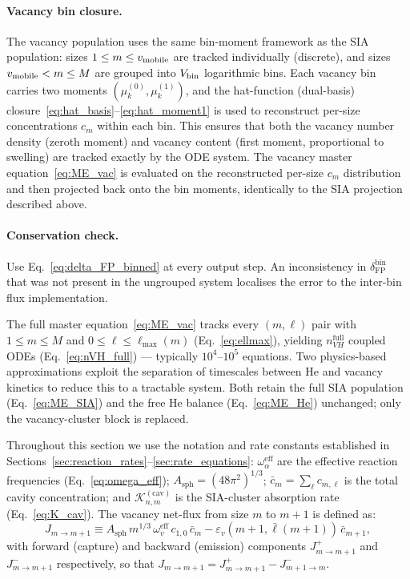 \documentclass[pdflatex,sn-basic]{sn-jnl} %
\begin{document}
\paragraph{Vacancy bin closure.}
The vacancy population uses the same bin-moment framework as the SIA
population: sizes $1 \leq m \leq v_{\rm mobile}$ are tracked individually
(discrete), and sizes $v_{\rm mobile} < m \leq M$ are grouped into
$V_{\rm bin}$ logarithmic bins. Each vacancy bin carries two moments
$(\mu_k^{(0)}, \mu_k^{(1)})$, and the hat-function (dual-basis)
closure~\eqref{eq:hat_basis}--\eqref{eq:hat_moment1} is used to
reconstruct per-size concentrations $c_m$ within each bin. This ensures
that both the vacancy number density (zeroth moment) and vacancy content
(first moment, proportional to swelling) are tracked exactly by the
ODE system. The vacancy master equation~\eqref{eq:ME_vac} is evaluated
on the reconstructed per-size $c_m$ distribution and then projected
back onto the bin moments, identically to the SIA projection described
above.

\paragraph{Conservation check.}
Use Eq.~\eqref{eq:delta_FP_binned} at every output step. An
inconsistency in $\delta_{\mathrm{FP}}^{\mathrm{bin}}$ that was not
present in the ungrouped system localises the error to the inter-bin
flux implementation.



The full master equation~\eqref{eq:ME_vac} tracks every $(m,\ell)$
pair with $1 \leq m \leq M$ and $0 \leq \ell \leq \ell_{\max}(m)$
(Eq.~\ref{eq:ellmax}), yielding $n_{VH}^{\mathrm{full}}$ coupled ODEs
(Eq.~\ref{eq:nVH_full}) --- typically $10^4$--$10^5$ equations. Two
physics-based approximations exploit the separation of timescales
between He and vacancy kinetics to reduce this to a tractable system.
Both retain the full SIA population (Eq.~\ref{eq:ME_SIA}) and the free
He balance (Eq.~\ref{eq:ME_He}) unchanged; only the vacancy-cluster
block is replaced.

Throughout this section we use the notation and rate constants
established in Sections~\ref{sec:reaction_rates}--\ref{sec:rate_equations}:
$\omega_\alpha^{\mathrm{eff}}$ are the effective reaction frequencies
(Eq.~\ref{eq:omega_eff}); $A_{\mathrm{sph}} = (48\pi^2)^{1/3}$;
$\bar{c}_m = \sum_\ell c_{m,\ell}$ is the total cavity concentration;
and $\mathcal{K}_{n,m}^{(\mathrm{cav})}$ is the SIA-cluster absorption
rate (Eq.~\ref{eq:K_cav}). The vacancy net-flux from size $m$ to $m+1$
is defined as:
\begin{equation}\label{eq:Jv}
    J_{m \to m+1}
    \equiv A_{\mathrm{sph}}\,m^{1/3}\,\omega_v^{\mathrm{eff}}\,
           c_{1,0}\,\bar{c}_m
         - \varepsilon_v(m{+}1,\bar{\ell}(m{+}1))\,\bar{c}_{m+1},
\end{equation}
with forward (capture) and backward (emission) components
$J_{m\to m+1}^{+}$ and $J_{m\to m+1}^{-}$ respectively, so that
$J_{m\to m+1} = J_{m\to m+1}^{+} - J_{m+1\to m}^{-}$.
\end{document}
